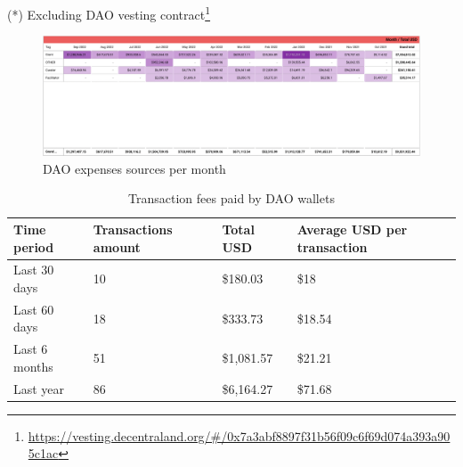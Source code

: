 \documentclass[MSE,Master,english]{twbook}%
\begin{document}
(*) Excluding DAO vesting contract\footnote{\url{https://vesting.decentraland.org/\#/0x7a3abf8897f31b56f09c6f69d074a393a905c1ac}}
\begin{figure}[H]
  \centering
  \includegraphics[width=\textwidth]{metrics/expenses.png}
  \caption{DAO expenses sources per month}
  \label{fig:expenses}
\end{figure}
\begin{center}
  \begin{table}[H]
    \begin{tabular}{ | m{8em} | m{10em} | m{6em} | m{15em} | }
      \hline
      \textbf{Time period} & \textbf{Transactions amount} & \textbf{Total USD} & \textbf{Average USD per transaction} \\ 
      \hline
      Last 30 days &	10 &	\$180.03 &	\$18 \\
      \hline
      Last 60 days &	18 &	\$333.73 &	\$18.54 \\
      \hline
      Last 6 months &	51 &	\$1,081.57 &	\$21.21 \\
      \hline
      Last year &	86 &	\$6,164.27 &	\$71.68 \\
      \hline
    \end{tabular}
    \caption{Transaction fees paid by DAO wallets}
    \label{table:fees}
  \end{table}
\end{center}
\end{document}
